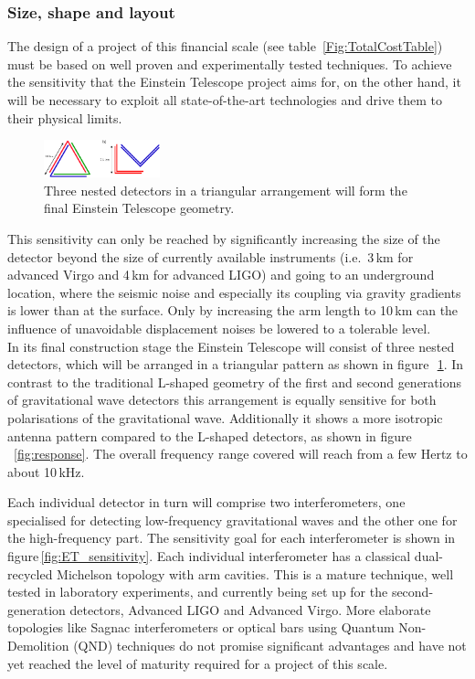 \subsubsection{Size, shape and layout}
The design of a project of this financial scale (see table~\ref{Fig:TotalCostTable}) must be based on well proven and experimentally tested techniques. To achieve the sensitivity that the Einstein Telescope project aims for, on the other hand, it will be necessary to exploit all state-of-the-art technologies and drive them to their physical limits.
\begin{figure}
	\centering
		\includegraphics[width=0.3\textwidth]{Intro/Intro_Figures/NestedDetectors.pdf}
	\caption{Three nested detectors in a triangular arrangement will 
	form the final Einstein Telescope geometry.}
	\label{fig:NestedDetectors}
\end{figure}
This sensitivity can only be reached by significantly increasing the size of the 
detector beyond the size of currently available instruments (i.e.\ 3\,km for advanced Virgo 
and 4\,km for advanced LIGO) and going to an underground location, where the seismic 
noise and especially its coupling via gravity gradients is lower than at the surface. Only by increasing the arm length to 10\,km 
can the influence of unavoidable displacement noises be lowered to a tolerable 
level.\\
In its final construction stage the Einstein Telescope will consist of three nested
detectors, which will be arranged in a triangular pattern as shown in 
figure\,~\ref{fig:NestedDetectors}. 
In contrast to the traditional L-shaped geometry of the first and second generations 
of gravitational wave detectors this arrangement is equally sensitive for both 
polarisations of the gravitational wave. Additionally it shows a more isotropic 
antenna pattern compared to the L-shaped detectors, as shown in 
figure\,~\ref{fig:response}. The overall frequency range covered will reach from 
a few Hertz to about 10\,kHz.

Each individual detector in turn will comprise two interferometers, one 
specialised for detecting low-frequency gravitational waves and the other one 
for the high-frequency part. The sensitivity goal for each interferometer is shown 
in figure\,\ref{fig:ET_sensitivity}. %
Each individual interferometer has a classical dual-recycled Michelson topology 
with arm cavities. This is a mature technique, well tested in laboratory 
experiments, and currently being set up for the second-generation detectors, 
Advanced LIGO and Advanced Virgo. More elaborate topologies like Sagnac 
interferometers or optical bars using Quantum Non-Demolition (QND) techniques 
do not promise significant advantages and have not yet reached the level of 
maturity required for a project of this scale.\\

